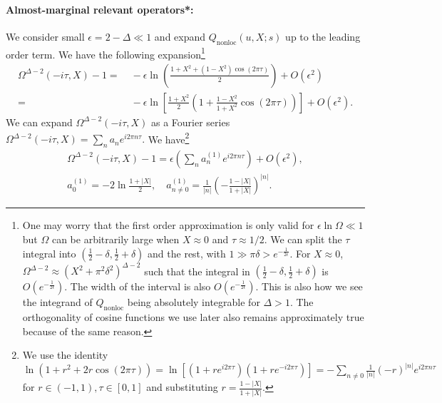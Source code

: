 \documentclass[a4paper,11pt]{article}
\theoremstyle{definition}
\begin{document}
\paragraph{Almost-marginal relevant operators*:} 
We consider small $\epsilon =2-\Delta\ll 1$ and expand $Q_{\text{nonloc}}(u,X;s)$ up to the leading order term. We have the following expansion\footnote{One may worry that the first order approximation is only valid for $\epsilon \ln\Omega \ll 1$ but $\Omega$ can be arbitrarily large when $X\approx 0$ and $\tau \approx 1/2$. We can split the $\tau$ integral into $(\frac{1}{2}-\delta, \frac{1}{2}+\delta)$ and the rest, with $1 \gg \pi\delta > e^{-\frac{1}{2\epsilon}}$. For $X\approx0$, $\Omega^{\Delta-2} \approx (X^2+\pi^2\delta^2)^{\Delta-2}$ such that the integral in $(\frac{1}{2}-\delta, \frac{1}{2}+\delta)$ is $O(e^{-\frac{1}{2\epsilon}})$. The width of the interval is also $O(e^{-\frac{1}{2\epsilon}})$. This is also how we see the integrand of $Q_{\text{nonloc}}$ being absolutely integrable for $\Delta > 1$. The orthogonality of cosine functions we use later also remains approximately true because of the same reason.}
\begin{align}
    \Omega^{\Delta-2}(-i\tau,X) - 1 =&\; - \epsilon \ln \left(\frac{1+X^2+(1-X^2)\cos(2\pi \tau)}{2}\right) + O(\epsilon^2)\\
    =&\; - \epsilon \ln \left[\frac{1+X^2}{2}\left(1+\frac{1-X^2}{1+X^2}\cos(2\pi \tau)\right)\right] + O(\epsilon^2). %
\end{align}
We can expand $\Omega^{\Delta-2}(-i\tau,X)$ as a Fourier series $\Omega^{\Delta-2}(-i\tau,X) = \sum_{n} a_n e^{i2\pi n \tau}.$ We have\footnote{We use the identity $\ln(1+r^2 + 2r\cos(2\pi\tau)) = \ln\left[(1+re^{i2\pi\tau})(1+re^{-i2\pi\tau})\right] = -\sum_{n \neq 0} \frac{1}{|n|}(-r)^{|n|}e^{i2\pi n\tau}$ for $r\in (-1,1), \tau\in[0,1]$ and substituting $r = \frac{1-|X|}{1+|X|}$.}
\begin{gather}
    \Omega^{\Delta-2}(-i\tau,X) - 1 = \epsilon \left(\sum_{n} a_n^{(1)}e^{i2 \pi n \tau} \right) + O(\epsilon^2),\\
    a_0^{(1)} =  -2\ln \frac{1+|X|}{2}, \quad a_{n \neq 0}^{(1)} = \frac{1}{|n|} \left(-\frac{1-|X|}{1+|X|}\right)^{|n|}.
\end{gather}
\end{document}
